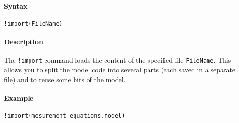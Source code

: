 


	\paragraph{Syntax}

\begin{verbatim}
!import(FileName)
\end{verbatim}

\paragraph{Description}

The \texttt{!import} command loads the content of the specified file
\texttt{FileName}. This allows you to split the model code into several
parts (each saved in a separate file) and to reuse some bits of the
model.

\paragraph{Example}

\begin{verbatim}
!import(mesurement_equations.model)
\end{verbatim}


